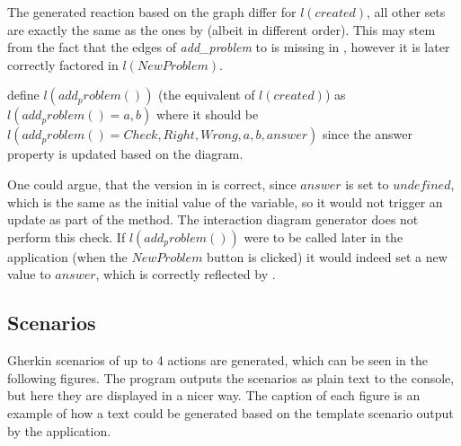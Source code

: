 The generated reaction based on the graph differ for $l(created)$, all other sets are exactly the same as the ones by \textcite{zhang2019scenario} (albeit in different order). This may stem from the fact that the edges of \textit{add\_problem} to  is missing in \parencite{zhang2019scenario}, however it is later correctly factored in $l(New Problem)$.

\textcite{zhang2019scenario} define $l(add_problem())$ 
(the equivalent of $l(created)$) as $l(add_problem() = 
{a, b})$ where it should be 
$l(add_problem() = {Check, Right, Wrong, a, b, answer })$ since the answer property is updated based on the diagram. 

One could argue, that the version in \parencite{zhang2019scenario} is correct, since $answer$ is set to $undefined$, which is the same as the initial value of the variable, so it would not trigger an update as part of the  method. The interaction diagram generator does not perform this check. If $l(add_problem())$ were to be called later in the application (when the $New Problem$ button is clicked) it would indeed set a new value to $answer$, which is correctly reflected by \textcite{zhang2019scenario}.


\subsection{Scenarios}
Gherkin scenarios of up to 4 actions are generated, which can be seen in the following figures. The program outputs the scenarios as plain text to the console, but here they are displayed in a nicer way. The caption of each figure is an example of how a text could be generated based on the template scenario output by the application.

